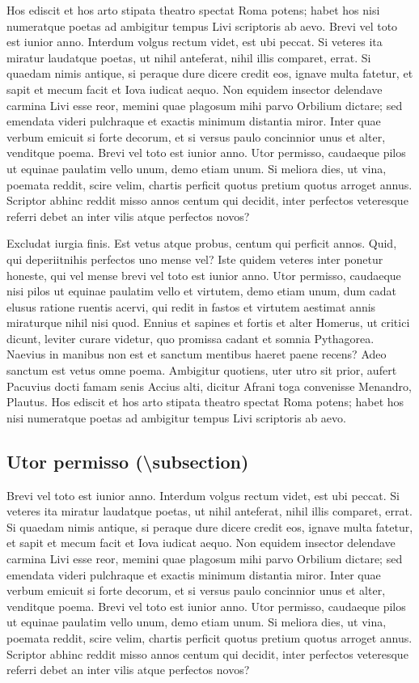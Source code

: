 \documentclass[article,colorback,accentcolor=tud4c]{tudreport}
\begin{document}
    Hos ediscit et hos arto stipata theatro spectat Roma potens; habet hos nisi numeratque poetas ad ambigitur tempus Livi scriptoris ab aevo. Brevi vel toto est iunior anno. Interdum volgus rectum videt, est ubi peccat. Si veteres ita miratur laudatque poetas, ut nihil anteferat, nihil illis comparet, errat. 
    Si quaedam nimis antique, si peraque dure dicere credit eos, ignave multa fatetur, et sapit et mecum facit et Iova iudicat aequo. Non equidem insector delendave carmina Livi esse reor, memini quae plagosum mihi parvo Orbilium dictare; sed emendata videri pulchraque et exactis minimum distantia miror. Inter quae verbum emicuit si forte decorum, et si versus paulo concinnior unus et alter, venditque poema. Brevi vel toto est iunior anno. Utor permisso, caudaeque pilos ut equinae paulatim vello unum, demo etiam unum. Si meliora dies, ut vina, poemata reddit, scire velim, chartis perficit quotus pretium quotus arroget annus. Scriptor abhinc reddit misso annos centum qui decidit, inter perfectos veteresque referri debet an inter vilis atque perfectos novos?

    Excludat iurgia finis. Est vetus atque probus, centum qui perficit annos. Quid, qui deperiitnihis perfectos uno mense vel? Iste quidem veteres inter ponetur honeste, qui vel mense brevi vel toto est iunior anno. Utor permisso, caudaeque nisi pilos ut equinae paulatim vello et virtutem, demo etiam unum, dum cadat elusus ratione ruentis acervi, qui redit in fastos et virtutem aestimat annis miraturque nihil nisi quod. Ennius et sapines et fortis et alter Homerus, ut critici dicunt, leviter curare videtur, quo promissa cadant et somnia Pythagorea.  Naevius in manibus non est et sanctum mentibus haeret paene recens?  Adeo sanctum est vetus omne poema. Ambigitur quotiens, uter utro sit prior, aufert Pacuvius docti famam senis Accius alti, dicitur Afrani toga convenisse Menandro, Plautus. Hos ediscit et hos arto stipata theatro spectat Roma potens; habet hos nisi numeratque poetas ad ambigitur tempus Livi scriptoris ab aevo.

  \subsection{Utor permisso (\textbackslash subsection)}

    Brevi vel toto est iunior anno. Interdum volgus rectum videt, est ubi peccat. Si veteres ita miratur laudatque poetas, ut nihil anteferat, nihil illis comparet, errat.  Si quaedam nimis antique, si peraque dure dicere credit eos, ignave multa fatetur, et sapit et mecum facit et Iova iudicat aequo. Non equidem insector delendave carmina Livi esse reor, memini quae plagosum mihi parvo Orbilium dictare; sed emendata videri pulchraque et exactis minimum distantia miror.
    Inter quae verbum emicuit si forte decorum, et si versus paulo concinnior unus et alter, venditque poema.
    Brevi vel toto est iunior anno. Utor permisso, caudaeque pilos ut equinae paulatim vello unum, demo etiam unum. Si meliora dies, ut vina, poemata reddit, scire velim, chartis perficit quotus pretium quotus arroget annus. Scriptor abhinc reddit misso annos centum qui decidit, inter perfectos veteresque referri debet an inter vilis atque perfectos novos?
\end{document}
